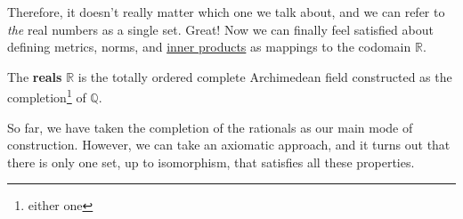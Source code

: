   Therefore, it doesn't really matter which one we talk about, and we can refer to \textit{the} real numbers as a single set. Great! Now we can finally feel satisfied about defining metrics, norms, and \hyperref[lin-def:inner-product]{inner products} as mappings to the codomain $\mathbb{R}$. 

  \begin{definition}
    \label{def:reals-as-construction-from-rationals}
    The \textbf{reals} $\mathbb{R}$ is the totally ordered complete Archimedean field constructed as the completion\footnote{either one} of $\mathbb{Q}$. 
  \end{definition}

  So far, we have taken the completion of the rationals as our main mode of construction. However, we can take an axiomatic approach, and it turns out that there is only one set, up to isomorphism, that satisfies all these properties. 

